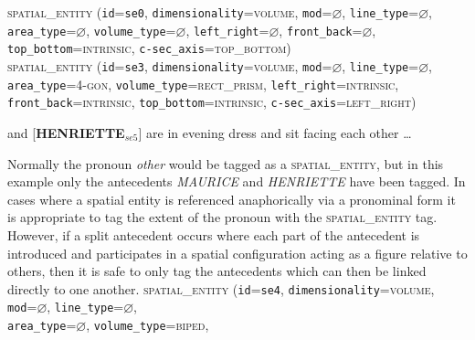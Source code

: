 \documentclass[11pt]{article}
\newcommand{\entity}[2]{[\textbf{\color{darkblue}#1}$_{se#2}$]}
\newenvironment{note}
{\list{}
 {\setlength
  {\itemindent}
  {\listparindent}}
   \item[\textbf{Note:}]\relax}
{\endlist}
\begin{document}
{\begin{note}
        \end{note}
        \textsc{spatial\_entity}
            (\texttt{id}=\texttt{se0},
            \texttt{dimensionality}=\textsc{volume},
            \texttt{mod}=$\varnothing$,
            \texttt{line\_type}=$\varnothing$,\\
            \texttt{area\_type}=$\varnothing$,
            \texttt{volume\_type}=$\varnothing$,
            \texttt{left\_right}=$\varnothing$,
            \texttt{front\_back}=$\varnothing$,\\
            \texttt{top\_bottom}=\textsc{intrinsic},
            \texttt{c-sec\_axis}=\textsc{top\_bottom})\vspace{0.5em}\\
        \textsc{spatial\_entity}
            (\texttt{id}=\texttt{se3},
            \texttt{dimensionality}=\textsc{volume},
            \texttt{mod}=$\varnothing$,
            \texttt{line\_type}=$\varnothing$,\\
            \texttt{area\_type}=\textsc{4-gon},
            \texttt{volume\_type}=\textsc{rect\_prism},
            \texttt{left\_right}=\textsc{intrinsic},\\
            \texttt{front\_back}=\textsc{intrinsic},
            \texttt{top\_bottom}=\textsc{intrinsic},
            \texttt{c-sec\_axis}=\textsc{left\_right})
        \label{ex:sofa}
	\item \entity{MAURICE}{4} and \entity{HENRIETTE}{5} are in evening dress and sit facing each other \ldots
    \begin{note}
        Normally the pronoun \emph{other} would be tagged as a \textsc{spatial\_entity}, but in this example only the antecedents \emph{MAURICE} and \emph{HENRIETTE} have been tagged. In cases where a spatial entity is referenced anaphorically via a pronominal form it is appropriate to tag the extent of the pronoun with the \textsc{spatial\_entity} tag. However, if a split antecedent occurs where each part of the antecedent is introduced and participates in a spatial configuration acting as a figure relative to others, then it is safe to only tag the antecedents which can then be linked directly to one another.
    \end{note}
        \textsc{spatial\_entity}
            (\texttt{id}=\texttt{se4},
            \texttt{dimensionality}=\textsc{volume},
            \texttt{mod}=$\varnothing$,
            \texttt{line\_type}=$\varnothing$,\\
            \texttt{area\_type}=$\varnothing$,
            \texttt{volume\_type}=\textsc{biped},
}
\end{document}
